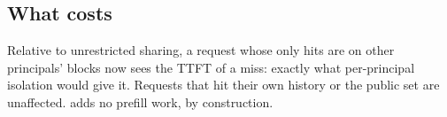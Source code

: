\subsection{What \sys costs}
Relative to unrestricted sharing, a request whose only hits are on other
principals' blocks now sees the TTFT of a miss: exactly what per-principal
isolation would give it. Requests that hit their own history or the public set
are unaffected. \sys adds no prefill work, by construction.
